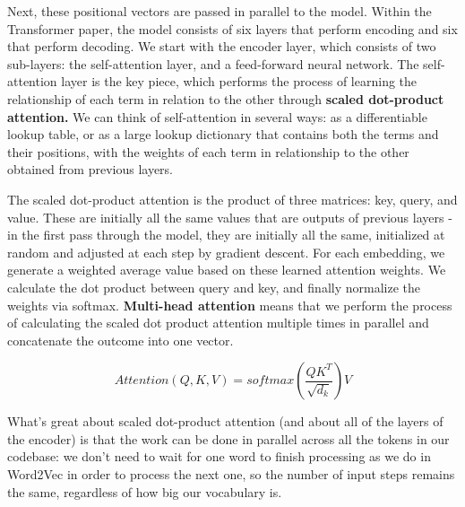 \documentclass[11pt, table]{diazessay} %
\begin{document}
\begin{sloppypar}
Next, these positional vectors are passed in parallel to the model. Within the Transformer paper, the model consists of six layers that perform encoding and six that perform decoding. We start with the encoder layer, which consists of two sub-layers: the self-attention layer, and a feed-forward neural network. The self-attention layer is the key piece, which performs the process of learning the relationship of each term in relation to the other through \textbf{scaled dot-product attention.} We can think of self-attention in several ways: as a differentiable lookup table, or as a large lookup dictionary that contains both the terms and their positions, with the weights of each term in relationship to the other obtained from previous layers.

The scaled dot-product attention is  the product of three matrices: key, query, and value. These are initially all the same values that are outputs of previous layers - in the first pass through the model, they are initially all the same, initialized at random and adjusted at each step by gradient descent. For each embedding, we generate a weighted average value based on these learned attention weights. We calculate the dot product between query and key, and finally normalize the weights via softmax. \textbf{Multi-head attention} means that we perform the process of calculating the scaled dot product attention multiple times in parallel and concatenate the outcome into one vector.

\begin{equation}
Attention(Q, K, V) = softmax(\frac{QK^T}{\sqrt{d_k}})V
\end{equation}

What's great about scaled dot-product attention (and about all of the layers of the encoder) is that the work can be done in parallel across all the tokens in our codebase: we don't need to wait for one word to finish processing as we do in Word2Vec in order to process the next one, so the number of input steps remains the same, regardless of how big our vocabulary is.


\end{sloppypar}
\end{document}
